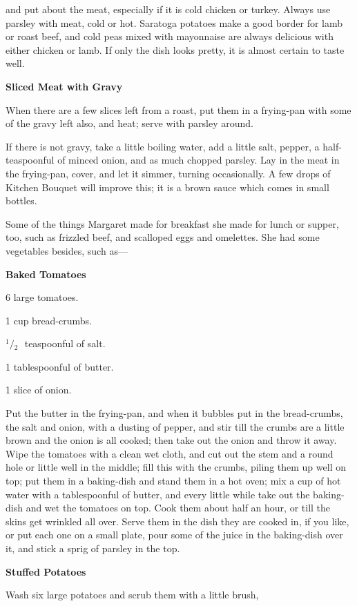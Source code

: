 \documentclass[11pt]{book}
\newcommand{\indpar}{\par\noindent\hspace*{\parindent}}
\newcommand{\ingredient}{\indpar}
\newcommand{\instruction}{\indpar}
\newcommand{\OneHalf}{\ensuremath{{}^1\!\!/\!{}_2\mbox{\ }}}
\newenvironment{RecipeTitle}{\medskip\begin{center}\large\bf }{\end{center}\smallskip}
\begin{document}
and put about the meat, especially if it is cold chicken
or turkey.  Always use parsley with meat, cold or hot.
Saratoga potatoes make a good border for lamb or roast beef,
and cold peas mixed with mayonnaise are always delicious
with either chicken or lamb.  If only the dish looks pretty,
it is almost certain to taste well.
\begin{RecipeTitle}
Sliced Meat with Gravy\label{sliced_meat_with_gravy}
\end{RecipeTitle}
  When there are a few slices left from a roast, put them
in a frying-pan with some of the gravy left also, and heat;
serve with parsley around.
\instruction
  If there is not gravy, take a little boiling water, add
a little salt, pepper, a half-teaspoon\-ful of minced
onion, and as much chopped parsley.  Lay in the meat in the
frying-pan, cover, and let it simmer, turning occasionally.
A few drops of Kitchen Bouquet will improve this; it is a
brown sauce which comes in small bottles.
\medskip
\indpar
  Some of the things Margaret made for breakfast she made
for lunch or supper, too, such as frizzled beef, and
scalloped eggs and omelettes.  She had some vegetables
besides, such as---
\begin{RecipeTitle}
Baked Tomatoes\label{baked_tomatoes}
\end{RecipeTitle}
\ingredient  6 large tomatoes.
\ingredient  1 cup bread-crumbs.
\ingredient  \OneHalf teaspoonful of salt.
\ingredient  1 tablespoonful of butter.
\ingredient  1 slice of onion.
\instruction
  Put the butter in the frying-pan, and when it bubbles
put in the bread-crumbs, the salt and onion, with a dusting
of pepper, and stir till the crumbs are a little brown and
the onion is all cooked; then take out the onion and throw
it away.  Wipe the tomatoes with a clean wet cloth, and cut
out the stem and a round hole or little well in the middle;
fill this with the crumbs, piling them up well on top; put
them in a baking-dish and stand them in a hot oven; mix a
cup of hot water with a tablespoonful of butter, and every
little while take out the baking-dish and wet the tomatoes
on top.  Cook them about half an hour, or till the skins
get wrinkled all over.  Serve them in the dish they are
cooked in, if you like, or put each one on a small plate,
pour some of the juice in the baking-dish over it, and
stick a sprig of parsley in the top.
\begin{RecipeTitle}
Stuffed Potatoes\label{stuffed_potatoes}
\end{RecipeTitle}
\instruction
  Wash six large potatoes and scrub them with a little brush,
\end{document}
